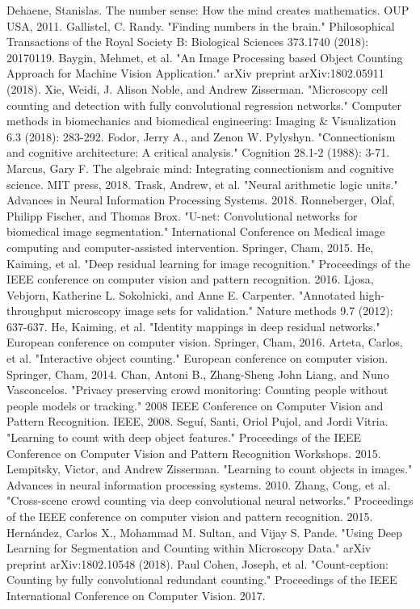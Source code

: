 \documentclass[runningheads]{llncs}
\begin{document}
\clearpage

\begin{thebibliography}{00}

  Dehaene, Stanislas. The number sense: How the mind creates mathematics. OUP USA, 2011.
 Gallistel, C. Randy. "Finding numbers in the brain." Philosophical Transactions of the Royal Society B: Biological Sciences 373.1740 (2018): 20170119.
 Baygin, Mehmet, et al. "An Image Processing based Object Counting Approach for Machine Vision Application." arXiv preprint arXiv:1802.05911 (2018).
 Xie, Weidi, J. Alison Noble, and Andrew Zisserman. "Microscopy cell counting and detection with fully convolutional regression networks." Computer methods in biomechanics and biomedical engineering: Imaging \& Visualization 6.3 (2018): 283-292.
Fodor, Jerry A., and Zenon W. Pylyshyn. "Connectionism and cognitive architecture: A critical analysis." Cognition 28.1-2 (1988): 3-71.
Marcus, Gary F. The algebraic mind: Integrating connectionism and cognitive science. MIT press, 2018.
 Trask, Andrew, et al. "Neural arithmetic logic units." Advances in Neural Information Processing Systems. 2018.
 Ronneberger, Olaf, Philipp Fischer, and Thomas Brox. "U-net: Convolutional networks for biomedical image segmentation." International Conference on Medical image computing and computer-assisted intervention. Springer, Cham, 2015.
 He, Kaiming, et al. "Deep residual learning for image recognition." Proceedings of the IEEE conference on computer vision and pattern recognition. 2016.
Ljosa, Vebjorn, Katherine L. Sokolnicki, and Anne E. Carpenter. "Annotated high-throughput microscopy image sets for validation." Nature methods 9.7 (2012): 637-637.
 He, Kaiming, et al. "Identity mappings in deep residual networks." European conference on computer vision. Springer, Cham, 2016.
 Arteta, Carlos, et al. "Interactive object counting." European conference on computer vision. Springer, Cham, 2014.
 Chan, Antoni B., Zhang-Sheng John Liang, and Nuno Vasconcelos. "Privacy preserving crowd monitoring: Counting people without people models or tracking." 2008 IEEE Conference on Computer Vision and Pattern Recognition. IEEE, 2008.
Seguí, Santi, Oriol Pujol, and Jordi Vitria. "Learning to count with deep object features." Proceedings of the IEEE Conference on Computer Vision and Pattern Recognition Workshops. 2015.
 Lempitsky, Victor, and Andrew Zisserman. "Learning to count objects in images." Advances in neural information processing systems. 2010.
 Zhang, Cong, et al. "Cross-scene crowd counting via deep convolutional neural networks." Proceedings of the IEEE conference on computer vision and pattern recognition. 2015.
 Hernández, Carlos X., Mohammad M. Sultan, and Vijay S. Pande. "Using Deep Learning for Segmentation and Counting within Microscopy Data." arXiv preprint arXiv:1802.10548 (2018).
 Paul Cohen, Joseph, et al. "Count-ception: Counting by fully convolutional redundant counting." Proceedings of the IEEE International Conference on Computer Vision. 2017.


\end{thebibliography}
\end{document}
